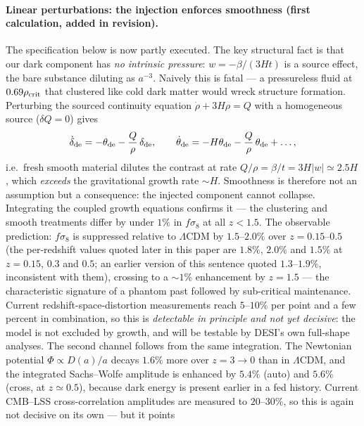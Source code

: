 \documentclass[11pt]{article}
\begin{document}
\paragraph{Linear perturbations: the injection enforces smoothness (first calculation, added in revision).}
The specification below is now partly executed. The key structural fact is that our dark component has
\emph{no intrinsic pressure}: $w = -\beta/(3Ht)$ is a source effect, the bare substance diluting as
$a^{-3}$. Naively this is fatal --- a pressureless fluid at $0.69\rho_{\rm crit}$ that clustered like
cold dark matter would wreck structure formation. Perturbing the sourced continuity equation
$\dot\rho + 3H\rho = Q$ with a homogeneous source ($\delta Q = 0$) gives
\begin{equation}
\dot\delta_{\rm de} = -\theta_{\rm de} - \frac{Q}{\rho}\,\delta_{\rm de}, \qquad
\dot\theta_{\rm de} = -H\theta_{\rm de} - \frac{Q}{\rho}\,\theta_{\rm de} + \ldots,
\end{equation}
i.e.\ fresh smooth material dilutes the contrast at rate $Q/\rho = \beta/t = 3H|w| \simeq 2.5H$, which
\emph{exceeds} the gravitational growth rate $\sim H$. Smoothness is therefore not an assumption but a
consequence: the injected component cannot collapse. Integrating the coupled growth equations confirms
it --- the clustering and smooth treatments differ by under $1\%$ in $f\sigma_8$ at all $z < 1.5$.
The observable prediction: $f\sigma_8$ is suppressed relative to $\Lambda$CDM by $1.5$--$2.0\%$ over
$z = 0.15$--$0.5$ (the per-redshift values quoted later in this paper are $1.8\%$, $2.0\%$ and $1.5\%$ at $z = 0.15$, $0.3$ and $0.5$; an earlier version of this sentence quoted $1.3$--$1.9\%$, inconsistent with them), crossing to a $\sim 1\%$ enhancement by $z = 1.5$ --- the characteristic signature of
a phantom past followed by sub-critical maintenance. Current redshift-space-distortion measurements
reach $5$--$10\%$ per point and a few percent in combination, so this is \emph{detectable in principle
and not yet decisive}: the model is not excluded by growth, and will be testable by DESI's own
full-shape analyses. The second channel follows from the same integration. The Newtonian potential
$\Phi \propto D(a)/a$ decays $1.6\%$ more over $z = 3 \to 0$ than in $\Lambda$CDM, and the
integrated Sachs--Wolfe amplitude is enhanced by $5.4\%$ (auto) and $5.6\%$ (cross, at $z \simeq 0.5$),
because dark energy is present earlier in a fed history. Current CMB--LSS cross-correlation
amplitudes are measured to $20$--$30\%$, so this is again not decisive on its own --- but it points
\end{document}
